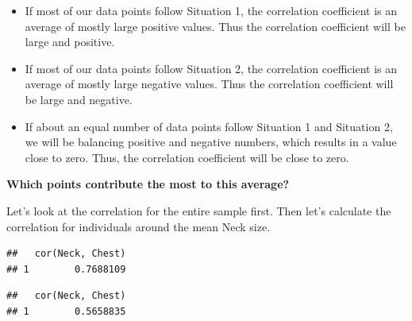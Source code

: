 \documentclass[]{book}
\newenvironment{Shaded}{\begin{snugshade}}{\end{snugshade}}
\newcommand{\CommentTok}[1]{\textcolor[rgb]{0.56,0.35,0.01}{\textit{#1}}}
\newcommand{\DecValTok}[1]{\textcolor[rgb]{0.00,0.00,0.81}{#1}}
\newcommand{\KeywordTok}[1]{\textcolor[rgb]{0.13,0.29,0.53}{\textbf{#1}}}
\newcommand{\NormalTok}[1]{#1}
\newcommand{\OperatorTok}[1]{\textcolor[rgb]{0.81,0.36,0.00}{\textbf{#1}}}
\newcommand{\StringTok}[1]{\textcolor[rgb]{0.31,0.60,0.02}{#1}}
\providecommand{\tightlist}{%
  \setlength{\itemsep}{0pt}\setlength{\parskip}{0pt}}
\begin{document}
\begin{itemize}
\tightlist
\item
  If most of our data points follow Situation 1, the correlation coefficient is an average of mostly large positive values. Thus the correlation coefficient will be large and positive.
\item
  If most of our data points follow Situation 2, the correlation coefficient is an average of mostly large negative values. Thus the correlation coefficient will be large and negative.
\item
  If about an equal number of data points follow Situation 1 and Situation 2, we will be balancing positive and negative numbers, which results in a value close to zero. Thus, the correlation coefficient will be close to zero.
\end{itemize}

\textbf{Which points contribute the most to this average?}

Let's look at the correlation for the entire sample first. Then let's calculate the correlation for individuals around the mean Neck size.

\begin{Shaded}
\end{Shaded}

\begin{verbatim}
##   cor(Neck, Chest)
## 1        0.7688109
\end{verbatim}

\begin{Shaded}
\end{Shaded}

\begin{verbatim}
##   cor(Neck, Chest)
## 1        0.5658835
\end{verbatim}
\end{document}
